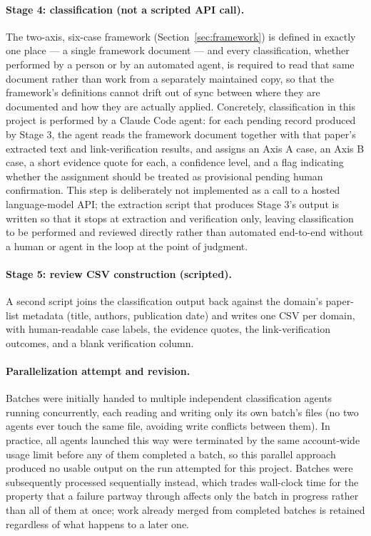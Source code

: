 \documentclass[11pt]{article}
\begin{document}
\paragraph{Stage 4: classification (not a scripted API call).} The two-axis, six-case
framework (Section~\ref{sec:framework}) is defined in exactly one place --- a single
framework document --- and every classification, whether performed by a person or by an
automated agent, is required to read that same document rather than work from a
separately maintained copy, so that the framework's definitions cannot drift out of
sync between where they are documented and how they are actually applied. Concretely,
classification in this project is performed by a Claude Code agent: for each pending
record produced by Stage 3, the agent reads the framework document together with that
paper's extracted text and link-verification results, and assigns an Axis A case, an
Axis B case, a short evidence quote for each, a confidence level, and a flag indicating
whether the assignment should be treated as provisional pending human confirmation. This
step is deliberately not implemented as a call to a hosted language-model API; the
extraction script that produces Stage 3's output is written so that it stops at
extraction and verification only, leaving classification to be performed and reviewed
directly rather than automated end-to-end without a human or agent in the loop at the
point of judgment.

\paragraph{Stage 5: review CSV construction (scripted).} A second script joins the
classification output back against the domain's paper-list metadata (title, authors,
publication date) and writes one CSV per domain, with human-readable case labels,
the evidence quotes, the link-verification outcomes, and a blank verification column.

\paragraph{Parallelization attempt and revision.} Batches were initially handed to
multiple independent classification agents running concurrently, each reading and
writing only its own batch's files (no two agents ever touch the same file, avoiding
write conflicts between them). In practice, all agents launched this way were
terminated by the same account-wide usage limit before any of them completed a batch,
so this parallel approach produced no usable output on the run attempted for this
project. Batches were subsequently processed sequentially instead, which trades
wall-clock time for the property that a failure partway through affects only the
batch in progress rather than all of them at once; work already merged from completed
batches is retained regardless of what happens to a later one.
\end{document}
